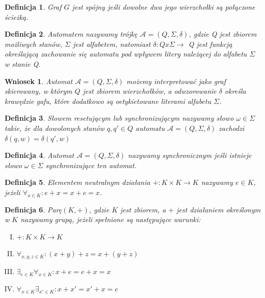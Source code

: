 \documentclass[12pt,a4paper]{article}
\newtheorem{df}{Definicja}[section]
\newtheorem{wn}{Wniosek}[section]
\begin{document}
\begin{df} 
Graf $G$ jest sp\'ojny je\'sli dowolne dwa jego wierzcho{\l}ki s\k{a} po{\l}\k{a}czone \'scie\.zk\k{a}.
\end{df}
\begin{df} 
Automatem nazywamy tr\'{o}jk\k{e} $\mathscr{A}=(Q, \Sigma, \delta)$, gdzie Q jest zbiorem mo\.{z}liwych stan\'{o}w, $\Sigma$ jest alfabetem, natomiast $\delta:Q x \Sigma \rightarrow$ Q jest funkcj\k{a} okre\'{s}laj\k{a}c\k{a} zachowanie si\k{e} automatu pod wp{\l}ywem litery nale\.{z}\k{a}cej do alfabetu $\Sigma$ w stanie Q.
\end{df}
\begin{wn}
Automat $\mathscr{A}=(Q, \Sigma, \delta)$ mo\.zemy interpretowa\'c jako graf skierowany, w kt\'orym $Q$ jest zbiorem wierzcho{\l}k\'ow, a odwzorowanie $\delta$ okre\'sla kraw\k{e}dzie gafu, kt\'ore dodatkowo s\k{a} oetykietowane literami alfabetu $\Sigma$.
\end{wn}
\begin{df} 
S{\l}owem resetuj\k{a}cym lub synchronizuj\k{a}cym nazywamy s{\l}owo $\omega \in \Sigma$ takie, \.{z}e dla dowolonych stan\'{o}w $q, q' \in Q$ automatu $\mathscr{A}=(Q, \Sigma, \delta)$ zachodzi $\delta(q,w)=\delta(q',w)$
\end{df}
\begin{df} 
Automat $\mathscr{A}=(Q, \Sigma, \delta)$ nazywamy synchronicznym je\'{s}li istnieje s{\l}owo $\omega \in \Sigma$ synchronizuj\k{a}ce ten automat.
\end{df}
\begin{df} 
Elementem neutralnym dzia{\l}ania $+:K\times K\rightarrow K$ nazywamy $e\in K$, je\.zeli $\forall_{x\in K}:e+x=x+e=x$.
\end{df}
\begin{df} 
Par\k{e}$(K,+)$, gdzie $K$ jest zbiorem, a $+$ jest dzia{\l}aniem okre\'slonym w $K$ nazywamy grup\k{a}, je\.zeli spe{\l}nione s\k{a} nast\k{e}puj\k{a}ce warunki:
\begin{enumerate}[I.]
\item $+: K\times K \rightarrow K$
\item $\forall_{x,y,z\in K}: (x+y)+z=x+(y+z)$
\item $\exists_{e\in K} \forall_{x\in K}: x+e=e+x=x$ 
\item $\forall_{x\in K} \exists_{x'\in K}: x+x'=x'+x=e$
\end{enumerate}
\end{df}
\end{document}
